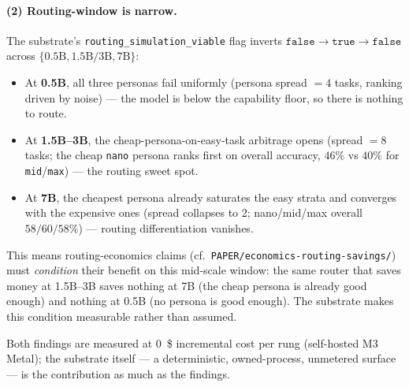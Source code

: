 \documentclass[11pt,a4paper]{article}
\begin{document}
\paragraph{(2) Routing-window is narrow.} The substrate's
\texttt{routing\_simulation\_viable} flag inverts
\(\texttt{false} \to \texttt{true} \to \texttt{false}\) across
\(\{0.5\text{B}, 1.5\text{B/3B}, 7\text{B}\}\):
\begin{itemize}
  \item At \textbf{0.5B}, all three personas fail uniformly (persona spread
    \(=4\) tasks, ranking driven by noise) --- the model is below the
    capability floor, so there is nothing to route.
  \item At \textbf{1.5B--3B}, the cheap-persona-on-easy-task arbitrage opens
    (spread \(=8\) tasks; the cheap \texttt{nano} persona ranks first on
    overall accuracy, \(46\%\) vs \(40\%\) for \texttt{mid}/\texttt{max}) ---
    the routing sweet spot.
  \item At \textbf{7B}, the cheapest persona already saturates the easy
    strata and converges with the expensive ones (spread collapses to 2;
    nano/mid/max overall \(58/60/58\%\)) --- routing differentiation
    vanishes.
\end{itemize}
This means routing-economics claims (cf.\
\texttt{PAPER/economics-routing-savings/}) must \emph{condition} their
benefit on this mid-scale window: the same router that saves money at
1.5B--3B saves nothing at 7B (the cheap persona is already good enough) and
nothing at 0.5B (no persona is good enough). The substrate makes this
condition measurable rather than assumed.

Both findings are measured at \SI{0}{\$} incremental cost per rung
(self-hosted M3 Metal); the substrate itself --- a deterministic,
owned-process, unmetered surface --- is the contribution as much as the
findings.
\end{document}
